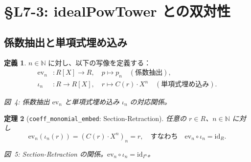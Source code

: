 \documentclass[a4paper,12pt]{article}
\theoremstyle{definition}
\newtheorem{definition}{定義}[section]
\theoremstyle{plain}
\newtheorem{theorem}[definition]{定理}
\newcommand{\figcap}[1]{\begin{center}\small\textit{#1}\end{center}}
\newcommand{\Ipower}[1]{I^{#1}}
\newcommand{\reesdeg}{\mathrm{reesDegreeTower}}
\newcommand{\lev}[1]{\ell_{#1}}
\begin{document}
\section{\S{}L7-3: idealPowTower との双対性}

\subsection{係数抽出と単項式埋め込み}

\begin{definition}
$n \in \mathbb{N}$ に対し、以下の写像を定義する：
\begin{align*}
  \mathrm{ev}_n &: R[X] \to R,\quad p \mapsto p_n
    \quad(\text{係数抽出}), \\
  \iota_n &: R \to R[X],\quad r \mapsto C(r) \cdot X^n
    \quad(\text{単項式埋め込み}).
\end{align*}
\end{definition}

\begin{center}
\end{center}
\figcap{図~4: 係数抽出 $\mathrm{ev}_n$ と単項式埋め込み $\iota_n$ の対応関係。}

\begin{theorem}[\texttt{coeff\_monomial\_embed}: Section-Retraction]
任意の $r \in R$、$n \in \mathbb{N}$ に対し
\[
  \mathrm{ev}_n(\iota_n(r)) = (C(r) \cdot X^n)_n = r,
  \quad\text{すなわち}\quad
  \mathrm{ev}_n \circ \iota_n = \mathrm{id}_R.
\]
\end{theorem}

\begin{center}
\end{center}
\figcap{図~5: Section-Retraction の関係。$\mathrm{ev}_n \circ \iota_n = \mathrm{id}_{\Ipower{n}}$。}
\end{document}
